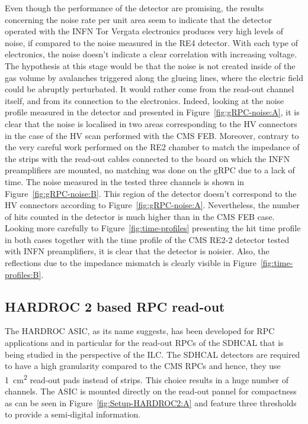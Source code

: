     Even though the performance of the detector are promising, the results concerning the noise rate per unit area seem to indicate that the detector operated with the INFN Tor Vergata electronics produces very high levels of noise, if compared to the noise measured in the RE4 detector. With each type of electronics, the noise doesn't indicate a clear correlation with increasing voltage. The hypothesis at this stage would be that the noise is not created inside of the gas volume by avalanches triggered along the glueing lines, where the electric field could be abruptly perturbated. It would rather come from the read-out channel itself, and from its connection to the electronics. Indeed, looking at the noise profile measured in the detector and presented in Figure~\ref{fig:gRPC-noise:A}, it is clear that the noise is localised in two areas corresponding to the HV connectors in the case of the HV scan performed with the CMS FEB. Moreover, contrary to the very careful work performed on the RE2 chamber to match the impedance of the strips with the read-out cables connected to the board on which the INFN preamplifiers are mounted, no matching was done on the gRPC due to a lack of time. The noise measured in the tested three channels is shown in Figure~\ref{fig:gRPC-noise:B}. This region of the detector doesn't correspond to the HV connectors according to Figure~\ref{fig:gRPC-noise:A}. Nevertheless, the number of hits counted in the detector is much higher than in the CMS FEB case. Looking more carefully to Figure~\ref{fig:time-profiles} presenting the hit time profile in both cases together with the time profile of the CMS RE2-2 detector tested with INFN preamplifiers, it is clear that the detector is noisier. Also, the reflections due to the impedance mismatch is clearly visible in Figure~\ref{fig:time-profiles:B}.

	\subsection{HARDROC 2 based RPC read-out}
	\label{chapt6:ssec:HARDROC2}
	
	The \acf{HARDROC} ASIC, as its name suggests, has been developed for RPC applications and in particular for the read-out RPCs of the SDHCAL that is being studied in the perspective of the ILC. The SDHCAL detectors are required to have a high granularity compared to the CMS RPCs and hence, they use \SI{1}{cm^2} read-out pads instead of strips. This choice results in a huge number of channels. The ASIC is mounted directly on the read-out pannel for compactness as can be seen in Figure~\ref{fig:Setup-HARDROC2:A} and feature three thresholds to provide a semi-digital information.
	 

